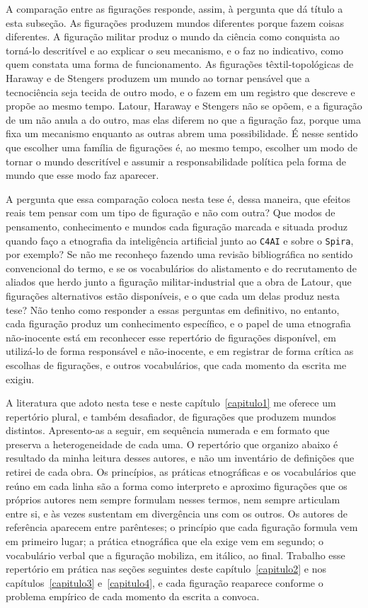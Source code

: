 A comparação entre as figurações responde, assim, à pergunta que dá título a esta subseção. As figurações produzem mundos diferentes porque fazem coisas diferentes. A figuração militar produz o mundo da ciência como conquista ao torná-lo descritível e ao explicar o seu mecanismo, e o faz no indicativo, como quem constata uma forma de funcionamento. As figurações têxtil-topológicas de Haraway e de Stengers produzem um mundo ao tornar pensável que a tecnociência seja tecida de outro modo, e o fazem em um registro que descreve e propõe ao mesmo tempo. Latour, Haraway e Stengers não se opõem, e a figuração de um não anula a do outro, mas elas diferem no que a figuração faz, porque uma fixa um mecanismo enquanto as outras abrem uma possibilidade. É nesse sentido que escolher uma família de figurações é, ao mesmo tempo, escolher um modo de tornar o mundo descritível e assumir a responsabilidade política pela forma de mundo que esse modo faz aparecer.

A pergunta que essa comparação coloca nesta tese é, dessa maneira, que efeitos reais tem pensar com um tipo de figuração e não com outra? Que modos de pensamento, conhecimento e mundos cada figuração marcada e situada produz quando faço a etnografia da inteligência artificial junto ao \texttt{C4AI} e sobre o \texttt{Spira}, por exemplo? Se não me reconheço fazendo uma revisão bibliográfica no sentido convencional do termo, e se os vocabulários do alistamento e do recrutamento de aliados que herdo junto a figuração militar-industrial que a obra de Latour, que figurações alternativos estão disponíveis, e o que cada um delas produz nesta tese? Não tenho como responder a essas perguntas em definitivo, no entanto, cada figuração produz um conhecimento específico, e o papel de uma etnografia não-inocente está em reconhecer esse repertório de figurações disponível, em utilizá-lo de forma responsável e não-inocente, e em registrar de forma crítica as escolhas de figurações, e outros vocabulários, que cada momento da escrita me exigiu. 

A literatura que adoto nesta tese e neste capítulo~\ref{capitulo1} me oferece um repertório plural, e também desafiador, de figurações que produzem mundos distintos. Apresento-as a seguir, em sequência numerada e em formato que preserva a heterogeneidade de cada uma. O repertório que organizo abaixo é resultado da minha leitura desses autores, e não um inventário de definições que retirei de cada obra. Os princípios, as práticas etnográficas e os vocabulários que reúno em cada linha são a forma como interpreto e aproximo figurações que os próprios autores nem sempre formulam nesses termos, nem sempre articulam entre si, e às vezes sustentam em divergência uns com os outros. Os autores de referência aparecem entre parênteses; o princípio que cada figuração formula vem em primeiro lugar; a prática etnográfica que ela exige vem em segundo; o vocabulário verbal que a figuração mobiliza, em itálico, ao final. Trabalho esse repertório em prática nas seções seguintes deste capítulo~\ref{capitulo2} e nos capítulos~\ref{capitulo3} e~\ref{capitulo4}, e cada figuração reaparece conforme o problema empírico de cada momento da escrita a convoca.

